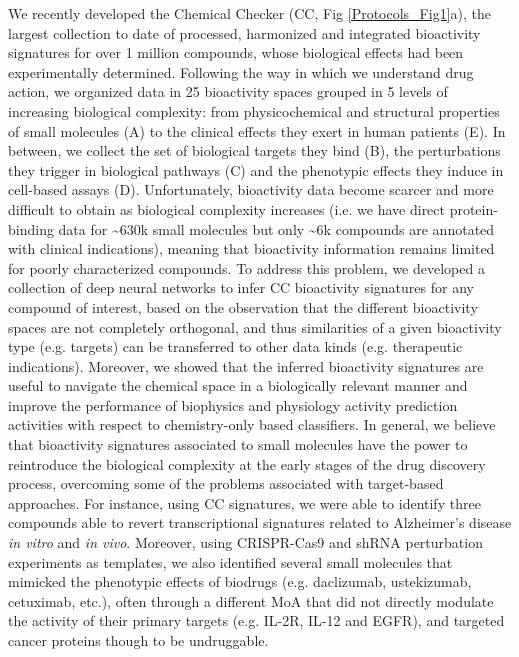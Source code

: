 We recently developed the Chemical Checker (CC, Fig \ref{Protocols_Fig1}a), the largest collection to date of processed, harmonized and integrated bioactivity signatures for over 1 million compounds, whose biological effects had been experimentally determined\cite{duran-frigola_extending_2020}. Following the way in which we understand drug action, we organized data in 25 bioactivity spaces grouped in 5 levels of increasing biological complexity: from physicochemical and structural properties of small molecules (A) to the clinical effects they exert in human patients (E). In between, we collect the set of biological targets they bind (B), the perturbations they trigger in biological pathways (C) and the phenotypic effects they induce in cell-based assays (D). Unfortunately, bioactivity data become scarcer and more difficult to obtain as biological complexity increases (i.e. we have direct protein-binding data for \textasciitilde630k small molecules but only \textasciitilde6k compounds are annotated with clinical indications), meaning that bioactivity information remains limited for poorly characterized compounds. To address this problem, we developed a collection of deep neural networks to infer CC bioactivity signatures for any compound of interest\cite{bertoni_bioactivity_2021, comajuncosa-creus_stereochemically-aware_2024}, based on the observation that the different bioactivity spaces are not completely orthogonal, and thus similarities of a given bioactivity type (e.g. targets) can be transferred to other data kinds (e.g. therapeutic indications). Moreover, we showed that the inferred bioactivity signatures are useful to navigate the chemical space in a biologically relevant manner and improve the performance of biophysics and physiology activity prediction activities with respect to chemistry-only based classifiers. In general, we believe that bioactivity signatures associated to small molecules have the power to reintroduce the biological complexity at the early stages of the drug discovery process, overcoming some of the problems associated with target-based approaches. For instance, using CC signatures, we were able to identify three compounds able to revert transcriptional signatures related to Alzheimer’s disease \textit{in vitro} and \textit{in vivo}\cite{pauls}. Moreover, using CRISPR-Cas9 and shRNA perturbation experiments as templates, we also identified several small molecules that mimicked the phenotypic effects of biodrugs (e.g. daclizumab, ustekizumab, cetuximab, etc.), often through a different MoA that did not directly modulate the activity of their primary targets (e.g. IL-2R, IL-12 and EGFR)\cite{duran-frigola_extending_2020}, and targeted cancer proteins though to be undruggable\cite{bertoni_bioactivity_2021}.


